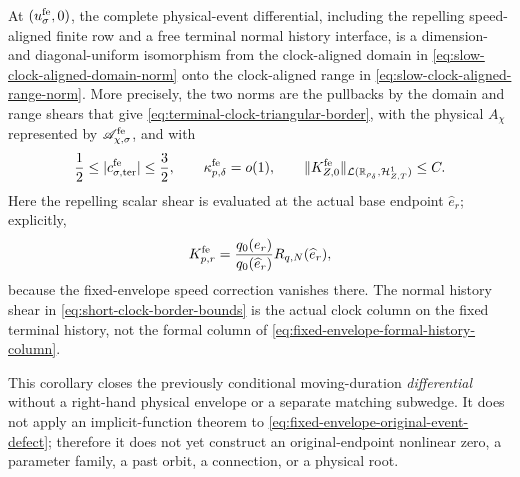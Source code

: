 \begin{corollary}
At \((u_\sigma^{\rm fe},0)\), the complete physical-event differential,
including the repelling speed-aligned finite row and a free terminal normal
history interface, is a dimension- and diagonal-uniform isomorphism from
the clock-aligned domain in
\cref{eq:slow-clock-aligned-domain-norm} onto the clock-aligned range in
\cref{eq:slow-clock-aligned-range-norm}.  More precisely, the two norms
are the pullbacks by the domain and range shears that give
\cref{eq:terminal-clock-triangular-border}, with the physical
\(A_\chi\) represented by \(\mathscr A_{\chi,\sigma}^{\rm fe}\), and with
\begin{equation}
 \frac12\le |c_{\sigma,\rm ter}^{\rm fe}|\le\frac32,
 \qquad
 \kappa_{p,\delta}^{\rm fe}=o(1),
 \qquad
 \|K_{Z,0}^{\rm fe}\|_
  {\mathcal L(\mathbb R_{\rho_\delta},\mathcal H_{Z,T}^1)}
 \le C.                                          \label{eq:short-clock-border-bounds}
\end{equation}
Here the repelling scalar shear is evaluated at the actual base endpoint
\(\widehat e_r\); explicitly,
\begin{equation}
 K_{p,r}^{\rm fe}
 =\frac{q_0(e_r)}{q_0(\widehat e_r)}
       R_{q,N}(\widehat e_r),                   \label{eq:short-clock-base-scalar-shear}
\end{equation}
because the fixed-envelope speed correction vanishes there.  The normal
history shear in \cref{eq:short-clock-border-bounds} is the actual clock
column on the fixed terminal history, not the formal column of
\cref{eq:fixed-envelope-formal-history-column}.

This corollary closes the previously conditional moving-duration
\emph{differential} without a right-hand physical envelope or a
separate matching subwedge.  It does not
apply an implicit-function theorem to
\cref{eq:fixed-envelope-original-event-defect}; therefore it does not yet
construct an original-endpoint nonlinear zero, a parameter family, a past
orbit, a connection, or a physical root.
\end{corollary}

